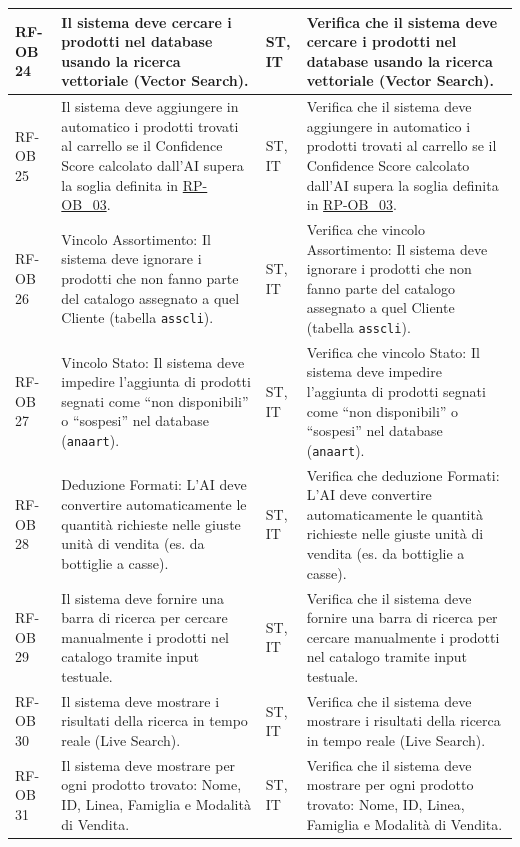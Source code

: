 \documentclass[a4paper,11pt,oneside]{scrartcl}
\begin{document}
\begin{longtable}{|p{1.5cm}|p{4.5cm}|p{1.8cm}|p{6cm}|}
RF-OB 24 & Il sistema deve cercare i prodotti nel database usando la ricerca vettoriale (Vector Search). & ST, IT & Verifica che il sistema deve cercare i prodotti nel database usando la ricerca vettoriale (Vector Search). \\ \hline
RF-OB 25 & Il sistema deve aggiungere in automatico i prodotti trovati al carrello se il Confidence Score calcolato dall'AI supera la soglia definita in \hyperlink{rp-ob_3}{RP-OB\_03}. & ST, IT & Verifica che il sistema deve aggiungere in automatico i prodotti trovati al carrello se il Confidence Score calcolato dall'AI supera la soglia definita in \hyperlink{rp-ob_3}{RP-OB\_03}. \\ \hline
RF-OB 26 & Vincolo Assortimento: Il sistema deve ignorare i prodotti che non fanno parte del catalogo assegnato a quel Cliente (tabella \texttt{asscli}). & ST, IT & Verifica che vincolo Assortimento: Il sistema deve ignorare i prodotti che non fanno parte del catalogo assegnato a quel Cliente (tabella \texttt{asscli}). \\ \hline
RF-OB 27 & Vincolo Stato: Il sistema deve impedire l'aggiunta di prodotti segnati come ``non disponibili'' o ``sospesi'' nel database (\texttt{anaart}). & ST, IT & Verifica che vincolo Stato: Il sistema deve impedire l'aggiunta di prodotti segnati come ``non disponibili'' o ``sospesi'' nel database (\texttt{anaart}). \\ \hline
RF-OB 28 & Deduzione Formati: L'AI deve convertire automaticamente le quantità richieste nelle giuste unità di vendita (es. da bottiglie a casse). & ST, IT & Verifica che deduzione Formati: L'AI deve convertire automaticamente le quantità richieste nelle giuste unità di vendita (es. da bottiglie a casse). \\ \hline
RF-OB 29 & Il sistema deve fornire una barra di ricerca per cercare manualmente i prodotti nel catalogo tramite input testuale. & ST, IT & Verifica che il sistema deve fornire una barra di ricerca per cercare manualmente i prodotti nel catalogo tramite input testuale. \\ \hline
RF-OB 30 & Il sistema deve mostrare i risultati della ricerca in tempo reale (Live Search). & ST, IT & Verifica che il sistema deve mostrare i risultati della ricerca in tempo reale (Live Search). \\ \hline
RF-OB 31 & Il sistema deve mostrare per ogni prodotto trovato: Nome, ID, Linea, Famiglia e Modalità di Vendita. & ST, IT & Verifica che il sistema deve mostrare per ogni prodotto trovato: Nome, ID, Linea, Famiglia e Modalità di Vendita. \\ \hline

\end{longtable}
\end{document}

